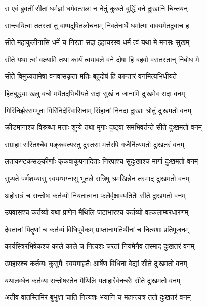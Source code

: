 
\twolineshloka
{स एवं ब्रुवतीं सीतां धर्मज्ञां धर्मवत्सलः}
{न नेतुं कुरुते बुद्धिं वने दुःखानि चिन्तयन्} %

\twolineshloka
{सान्त्वयित्वा ततस्तां तु बाष्पदूषितलोचनाम्}
{निवर्तनार्थे धर्मात्मा वाक्यमेतदुवाच ह} %

\twolineshloka
{सीते महाकुलीनासि धर्मे च निरता सदा}
{इहाचरस्व धर्मं त्वं यथा मे मनसः सुखम्} %

\twolineshloka
{सीते यथा त्वां वक्ष्यामि तथा कार्यं त्वयाबले}
{वने दोषा हि बहवो वसतस्तान् निबोध मे} %

\twolineshloka
{सीते विमुच्यतामेषा वनवासकृता मतिः}
{बहुदोषं हि कान्तारं वनमित्यभिधीयते} %

\twolineshloka
{हितबुद्ध्या खलु वचो मयैतदभिधीयते}
{सदा सुखं न जानामि दुःखमेव सदा वनम्} %

\twolineshloka
{गिरिनिर्झरसम्भूता गिरिनिर्दरिवासिनाम्}
{सिंहानां निनदा दुःखाः श्रोतुं दुःखमतो वनम्} %

\twolineshloka
{क्रीडमानाश्च विस्रब्धा मत्ताः शून्ये तथा मृगाः}
{दृष्ट्वा समभिवर्तन्ते सीते दुःखमतो वनम्} %

\twolineshloka
{सग्राहाः सरितश्चैव पङ्कवत्यस्तु दुस्तराः}
{मत्तैरपि गजैर्नित्यमतो दुःखतरं वनम्} %

\twolineshloka
{लताकण्टकसङ्कीर्णाः कृकवाकूपनादिताः}
{निरपाश्च सुदुःखाश्च मार्गा दुःखमतो वनम्} %

\twolineshloka
{सुप्यते पर्णशय्यासु स्वयम्भग्नासु भूतले}
{रात्रिषु श्रमखिन्नेन तस्माद् दुःखमतो वनम्} %

\twolineshloka
{अहोरात्रं च सन्तोषः कर्तव्यो नियतात्मना}
{फलैर्वृक्षावपतितैः सीते दुःखमतो वनम्} %

\twolineshloka
{उपवासश्च कर्तव्यो यथा प्राणेन मैथिलि}
{जटाभारश्च कर्तव्यो वल्कलाम्बरधारणम्} %

\twolineshloka
{देवतानां पितॄणां च कर्तव्यं विधिपूर्वकम्}
{प्राप्तानामतिथीनां च नित्यशः प्रतिपूजनम्} %

\twolineshloka
{कार्यस्त्रिरभिषेकश्च काले काले च नित्यशः}
{चरतां नियमेनैव तस्माद् दुःखतरं वनम्} %

\twolineshloka
{उपहारश्च कर्तव्यः कुसुमैः स्वयमाहृतैः}
{आर्षेण विधिना वेद्यां सीते दुःखमतो वनम्} %

\twolineshloka
{यथालब्धेन कर्तव्यः सन्तोषस्तेन मैथिलि}
{यताहारैर्वनचरैः सीते दुःखमतो वनम्} %

\twolineshloka
{अतीव वातस्तिमिरं बुभुक्षा चाति नित्यशः}
{भयानि च महान्त्यत्र ततो दुःखतरं वनम्} %

